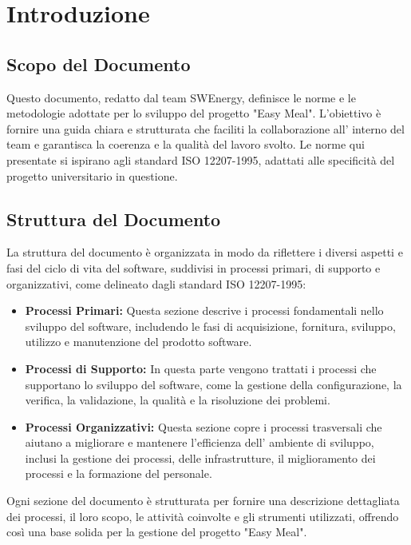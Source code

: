 \section{Introduzione}

\subsection{Scopo del Documento}
Questo documento, redatto dal team SWEnergy, definisce le norme e le
metodologie adottate per lo sviluppo del progetto "Easy Meal". L'obiettivo è
fornire una guida chiara e strutturata che faciliti la collaborazione all'
interno del team e garantisca la coerenza e la qualità del lavoro svolto. Le
norme qui presentate si ispirano agli standard ISO 12207-1995, adattati alle
specificità del progetto universitario in questione.

\subsection{Struttura del Documento}
La struttura del documento è organizzata in modo da riflettere i diversi
aspetti e fasi del ciclo di vita del software, suddivisi in processi primari,
di supporto e organizzativi, come delineato dagli standard ISO 12207-1995:

\begin{itemize}
	\item \textbf{Processi Primari:} Questa sezione descrive i processi
	      fondamentali nello sviluppo del software, includendo le fasi di
	      acquisizione, fornitura, sviluppo, utilizzo e manutenzione del
	      prodotto software.
	\item \textbf{Processi di Supporto:} In questa parte vengono trattati i
	      processi che supportano lo sviluppo del software, come la gestione
	      della configurazione, la verifica, la validazione, la qualità e la
	      risoluzione dei problemi.
	\item \textbf{Processi Organizzativi:} Questa sezione copre i processi
	      trasversali che aiutano a migliorare e mantenere l'efficienza dell'
	      ambiente di sviluppo, inclusi la gestione dei processi, delle
	      infrastrutture, il miglioramento dei processi e la formazione del 
		  personale.
\end{itemize}

Ogni sezione del documento è strutturata per fornire una descrizione 
dettagliata dei processi, il loro scopo, le attività coinvolte e gli strumenti 
utilizzati, offrendo così una base solida per la gestione del progetto "Easy 
Meal".
